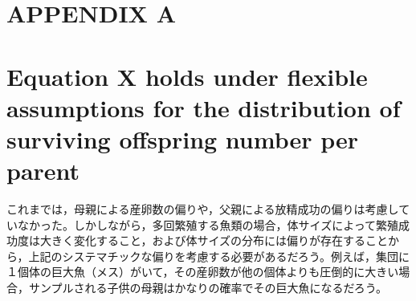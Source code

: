 \documentclass[AMA,STIX1COL]{WileyNJD-v2}
\begin{document}
\clearpage

\section*{APPENDIX A}
\setcounter{equation}{0}

\section*{Equation X holds under flexible assumptions for the distribution of surviving offspring number per parent}

\renewcommand{\theequation}{A\arabic{equation}}

これまでは，母親による産卵数の偏りや，父親による放精成功の偏りは考慮していなかった。しかしながら，多回繁殖する魚類の場合，体サイズによって繁殖成功度は大きく変化すること，および体サイズの分布には偏りが存在することから，上記のシステマチックな偏りを考慮する必要があるだろう。例えば，集団に１個体の巨大魚（メス）がいて，その産卵数が他の個体よりも圧倒的に大きい場合，サンプルされる子供の母親はかなりの確率でその巨大魚になるだろう。
\end{document}
